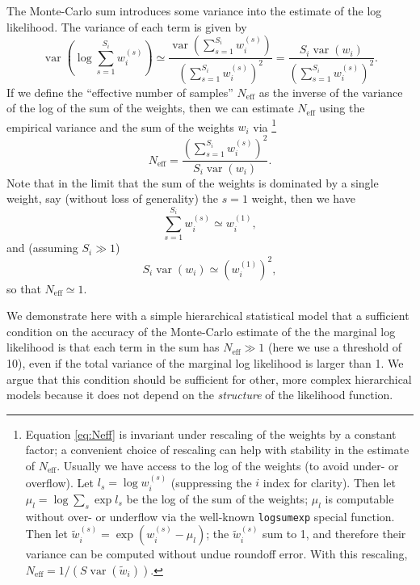 \documentclass[modern]{aastex631}
\newcommand{\Neff}{N_{\mathrm{eff}}}
\DeclareMathOperator{\var}{var}
\begin{document}
The Monte-Carlo sum introduces some variance into the estimate of the log
likelihood.  The variance of each term is given by 
\begin{equation}
    \var \left( \log \sum_{s=1}^{S_i} w_i^{(s)} \right) \simeq \frac{\var\left( \sum_{s=1}^{S_i} w_i^{(s)} \right)}{\left( \sum_{s=1}^{S_i} w_i^{(s)} \right)^2} = \frac{S_i \var\left( w_i \right)}{\left( \sum_{s=1}^{S_i} w_i^{(s)} \right)^2}.
\end{equation}
If we define the ``effective number of samples'' $\Neff$ as the inverse of the
variance of the log of the sum of the weights, then we can estimate $\Neff$
using the empirical variance and the sum of the weights $w_i$ via%
\footnote{Equation \eqref{eq:Neff} is invariant under rescaling of the weights
by a constant factor; a convenient choice of rescaling can help with stability
in the estimate of $\Neff$.  Usually we have access to the log of the weights
(to avoid under- or overflow).  Let $l_s = \log w_i^{(s)}$ (suppressing the $i$
index for clarity).  Then let $\mu_l = \log \sum_s \exp l_s$ be the log of the
sum of the weights; $\mu_l$ is computable without over- or underflow via the
well-known \texttt{logsumexp} special function.  Then let $\tilde{w}_i^{(s)} =
\exp\left( w_i^{(s)} - \mu_l \right)$; the $\tilde{w}_i^{(s)}$ sum to 1, and
therefore their variance can be computed without undue roundoff error.  With
this rescaling, $\Neff = 1 / \left( S \var\left( \tilde{w}_i \right) \right)$.}%
\begin{equation}
    \label{eq:Neff}
    \Neff = \frac{\left( \sum_{s=1}^{S_i} w_i^{(s)} \right)^2}{S_i \var\left( w_i \right)}.
\end{equation}
Note that in the limit that the sum of the weights is dominated by a single weight, say (without loss of generality) the $s = 1$ weight, then we have 
\begin{equation}
    \sum_{s=1}^{S_i} w_i^{(s)} \simeq w_i^{(1)},
\end{equation}
and (assuming $S_i \gg 1$) 
\begin{equation}
    S_i \var\left( w_i \right) \simeq \left( w_i^{(1)} \right)^2,    
\end{equation}
so that $\Neff \simeq 1$.

We demonstrate here with a simple hierarchical statistical model that a
sufficient condition on the accuracy of the Monte-Carlo estimate of the the
marginal log likelihood is that each term in the sum has $\Neff \gg 1$ (here we
use a threshold of 10), even if the total variance of the marginal log
likelihood is larger than 1.  We argue that this condition should be sufficient
for other, more complex hierarchical models because it does not depend on the
\emph{structure} of the likelihood function.
\end{document}
